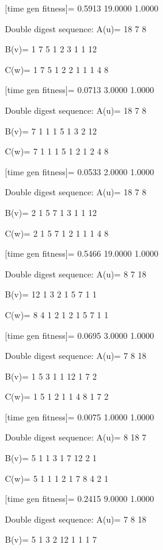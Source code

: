 [time gen fitness]=
    0.5913   19.0000    1.0000

Double digest sequence:
A(u)=
    18     7     8

B(v)=
     1     7     5     1     2     3     1     1    12

C(w)=
     1     7     5     1     2     2     1     1     1     4     8

[time gen fitness]=
    0.0713    3.0000    1.0000

Double digest sequence:
A(u)=
    18     7     8

B(v)=
     7     1     1     1     5     1     3     2    12

C(w)=
     7     1     1     1     5     1     2     1     2     4     8

[time gen fitness]=
    0.0533    2.0000    1.0000

Double digest sequence:
A(u)=
    18     7     8

B(v)=
     2     1     5     7     1     3     1     1    12

C(w)=
     2     1     5     7     1     2     1     1     1     4     8

[time gen fitness]=
    0.5466   19.0000    1.0000

Double digest sequence:
A(u)=
     8     7    18

B(v)=
    12     1     3     2     1     5     7     1     1

C(w)=
     8     4     1     2     1     2     1     5     7     1     1

[time gen fitness]=
    0.0695    3.0000    1.0000

Double digest sequence:
A(u)=
     7     8    18

B(v)=
     1     5     3     1     1    12     1     7     2

C(w)=
     1     5     1     2     1     1     4     8     1     7     2

[time gen fitness]=
    0.0075    1.0000    1.0000

Double digest sequence:
A(u)=
     8    18     7

B(v)=
     5     1     1     3     1     7    12     2     1

C(w)=
     5     1     1     1     2     1     7     8     4     2     1

[time gen fitness]=
    0.2415    9.0000    1.0000

Double digest sequence:
A(u)=
     7     8    18

B(v)=
     5     1     3     2    12     1     1     1     7

